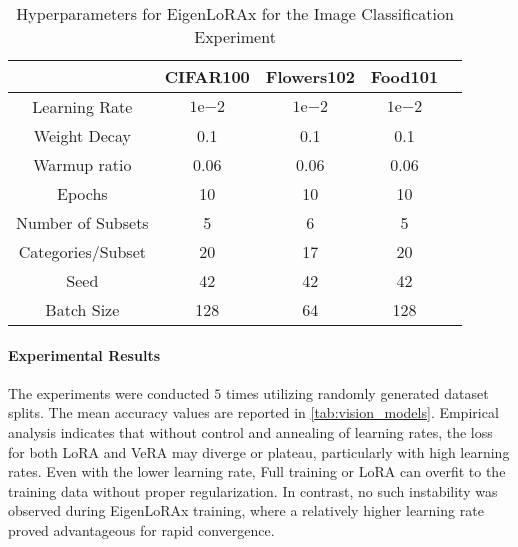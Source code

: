 \begin{table}[h]
  \centering
    \caption{Hyperparameters for EigenLoRAx for the Image Classification Experiment}
  \begin{tabular}{ccccc}
    \toprule
    & \textbf{CIFAR100} & \textbf{Flowers102} & \textbf{Food101}  \\
    \midrule
    Learning Rate            & $1\mathrm{e}{-2}$
 & $1\mathrm{e}{-2}$ & $1\mathrm{e}{-2}$ \\ 
    Weight Decay            & 0.1      & 0.1      & 0.1        \\ 
    Warmup ratio  & 0.06     & 0.06     & 0.06      \\ 
    Epochs        & 10       & 10       & 10            \\ 
    Number of Subsets          & 5       & 6        & 5   \\ 
    Categories/Subset          & 20      & 17        & 20  \\
    Seed          & 42        & 42        & 42        \\ 
    Batch Size          & 128       & 64        & 128     \\ 
    \bottomrule
  \end{tabular}
  \label{tab:appendix_classn_leora_hyp}
\end{table}

\paragraph{Experimental Results} The experiments were conducted $5$ times utilizing randomly generated dataset splits. The mean accuracy values are reported in \autoref{tab:vision_models}. Empirical analysis indicates that without control and annealing of learning rates, the loss for both LoRA and VeRA may diverge or plateau, particularly with high learning rates. Even with the lower learning rate, Full training or LoRA can overfit to the training data without proper regularization. In contrast, no such instability was observed during EigenLoRAx training, where a relatively higher learning rate proved advantageous for rapid convergence. 

